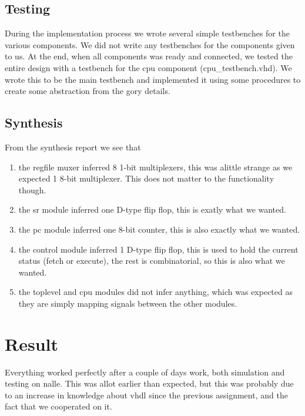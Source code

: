 \documentclass[10pt]{report}
\begin{document}
	\subsection*{Testing}

	During the implementation process we wrote several simple testbenches for the various components. We did not write any testbenches for the components given to us. At the end, when all components was ready and connected, we tested the entire design with a testbench for the cpu component (cpu\_testbench.vhd). We wrote this to be the main testbench and implemented it using some procedures to create some abstraction from the gory details.

	\subsection*{Synthesis}

	From the synthesis report we see that 
	\begin{enumerate}
		\item the regfile muxer inferred 8 1-bit multiplexers, this was alittle strange as we expected 1 8-bit multiplexer. This does not matter to the functionality though.
		\item the sr module inferred one D-type flip flop, this is exatly what we wanted.
		\item the pc module inferred one 8-bit counter, this is also exactly what we wanted.
		\item the control module inferred 1 D-type flip flop, this is used to hold the current status (fetch or execute), the rest is combinatorial, so this is also what we wanted.
		\item the toplevel and cpu modules did not infer anything, which was expected as they are simply mapping signals between the other modules.
	\end{enumerate}

	\section*{Result}


	Everything worked perfectly after a couple of days work, both simulation and testing on nalle. This was allot earlier than expected, but this was probably due to an increase in knowledge about vhdl since the previous assignment, and the fact that we cooperated on it.
\end{document}
